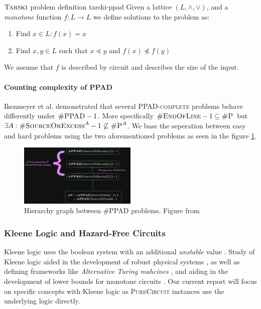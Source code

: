 \begin{definitionbox}{$\textnormal{\textsc{Tarski}}$ problem definition \cite{fearnley_FasterAlgorithmFinding_2022}}{tarski-ppad}
    Given a lattice $(L, \wedge, \vee)$, and a \textit{monotone} function $f : L \to L$ 
    we define solutions to the problem as:
    \begin{enumerate}
        \item Find $x \in L: f(x) = x$
        \item Find $x,y \in L$ such that $x \preceq y$ and $f(x) \not\preceq f(y)$
    \end{enumerate}
    We assume that $f$ is described by circuit and describes the size of the input.
\end{definitionbox}
%
\paragraph{Counting complexity of PPAD}


Ikenmeyer et al. \cite{ikenmeyer_WhatWhatNot_2022} demonstrated that several \textsc{PPAD-complete}
problems behave differently under $\textsc{\#PPAD} -1$. More specifically
$\textsc{\#EndOfLine} - 1 \subseteq \textsc{\#P}$ but $\exists A: \textsc{\#SourceOrExcess}^A  - 1\not\subseteq \textsc{\#P}^A$.
We base the seperation between easy and hard problems using the two aforementioned problems as seen in the figure \ref{fig:ppad-count-hier}.

\begin{figure}[h!]
    \centering
    \includegraphics[width=0.5\textwidth]{assets/chart-plot.png}
    \caption{Hierarchy graph between \textsc{\#PPAD} problems. Figure from \cite{ikenmeyer_WhatWhatNot_2022}}\label{fig:ppad-count-hier}
\end{figure}


\subsubsection{Kleene Logic and Hazard-Free Circuits}

Kleene logic uses the boolean system with an additional \textit{unstable} value \cite{kleene_IntroductionMetamathematics_2009}. 
Study of Kleene logic aided in
the development of robust physical systems \cite{friedrichs_MetastabilityContainingCircuits_2018}, as well as
defining frameworks like \textit{Alternative Turing mahcines} \cite{kozen_TheoryComputation_2006}, and
aiding in the development of lower bounds for monotone circuits
\cite{eichelberger_HazardDetectionCombinational_1965, ikenmeyer_ComplexityHazardfreeCircuits_2019,ikenmeyer_KarchmerWigdersonGamesHazardfree_2022,  bund_SmallHazardFreeTransducers_2025}. 
Our current report will focus on specific concepts with Kleene logic as \textsc{PureCircuit} instances
use the underlying logic directly.

